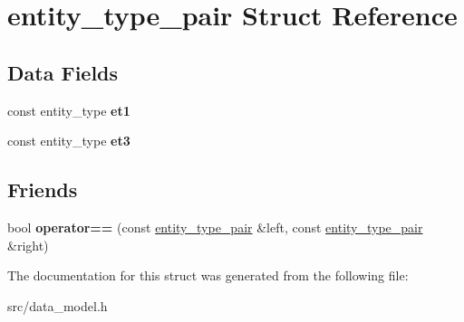 \hypertarget{structentity__type__pair}{}\section{entity\+\_\+type\+\_\+pair Struct Reference}
\label{structentity__type__pair}
\subsection*{Data Fields}
\begin{DoxyCompactItemize}
\item 
\mbox{\label{structentity__type__pair_aac00f0d65f32a57745f708c2b1cd9b1f}} 
const entity\+\_\+type {\bfseries et1}
\item 
\mbox{\label{structentity__type__pair_af1298e0bc96d48d5ae9b6bcdd0430ea3}} 
const entity\+\_\+type {\bfseries et3}
\end{DoxyCompactItemize}
\subsection*{Friends}
\begin{DoxyCompactItemize}
\item 
\mbox{\label{structentity__type__pair_ab148ef41047fcbd537a8f98b11e11045}} 
bool {\bfseries operator==} (const \hyperlink{structentity__type__pair}{entity\+\_\+type\+\_\+pair} \&left, const \hyperlink{structentity__type__pair}{entity\+\_\+type\+\_\+pair} \&right)
\end{DoxyCompactItemize}


The documentation for this struct was generated from the following file\+:\begin{DoxyCompactItemize}
\item 
src/data\+\_\+model.\+h\end{DoxyCompactItemize}
